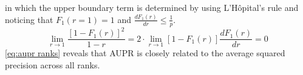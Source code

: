 %
in which the upper boundary term is determined by using L'Hôpital's rule and noticing that $F_1(r=1) = 1$ and
$\frac{d F_1(r)}{dr} \le \frac{1}{p}$.
%
\begin{equation*}
    \lim_{r \to 1} \frac{[1 - F_1(r)]^2}{1 - r}
    = 2 \cdot \lim_{r \to 1} \left[1 - F_1(r)\right] \frac{d F_1(r)}{dr}
    = 0
\end{equation*}
%
\autoref{eq:aupr ranks} reveals that AUPR is closely related to the average squared precision across all ranks.



%  

